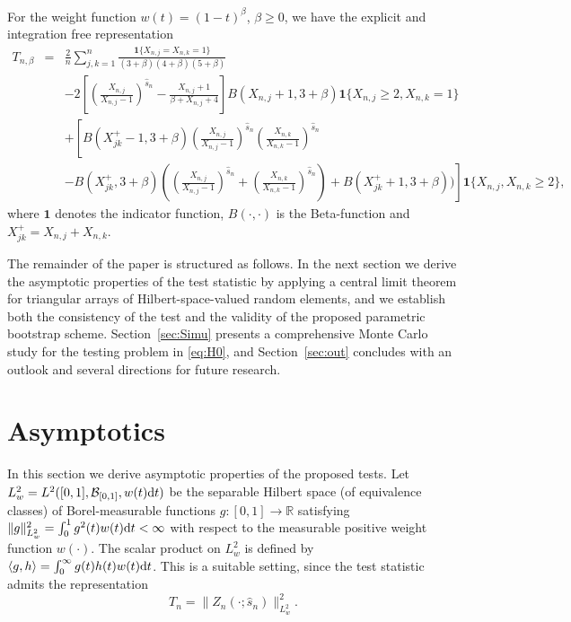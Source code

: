 \documentclass{article}
\theoremstyle{thm}
\theoremstyle{def}
\newcommand{\R}{\mathbb{R}} %
\begin{document}
For  the weight function $w(t)=(1-t)^\beta$, $\beta\ge0$, we have the explicit and integration free representation
\begin{eqnarray*}
T_{n,\beta}&=&\frac2n\sum_{j,k=1}^n\frac{\mathbf{1}\{X_{n,j}=X_{n,k}=1\}}{(3+\beta)(4+\beta)(5+\beta)}\\&&-2\left[\left(\frac{X_{n,j}}{X_{n,j}-1}\right)^{\widehat{s}_n}-\frac{X_{n,j}+1}{\beta+X_{n,j}+4}\right]B(X_{n,j}+1,3+\beta)\mathbf{1}\{X_{n,j}\ge2,X_{n,k}=1\}\\
&&+\left[B(X_{jk}^+-1,3+\beta)\left(\frac{X_{n,j}}{X_{n,j}-1}\right)^{\widehat{s}_n}\left(\frac{X_{n,k}}{X_{n,k}-1}\right)^{\widehat{s}_n}\right.
\\&&\left.-B(X_{jk}^+,3+\beta)\left(\left(\frac{X_{n,j}}{X_{n,j}-1}\right)^{\widehat{s}_n}+\left(\frac{X_{n,k}}{X_{n,k}-1}\right)^{\widehat{s}_n}\right)+B(X_{jk}^++1,3+\beta))\right]\mathbf{1}\{X_{n,j},X_{n,k}\ge2\},
\end{eqnarray*}
where $\mathbf{1}$ denotes the indicator function, $B(\cdot,\cdot)$ is the Beta-function and $X_{jk}^+=X_{n,j}+X_{n,k}$.

The remainder of the paper is structured as follows. In the next section we derive the asymptotic properties of the test statistic by applying a central limit theorem for triangular arrays of Hilbert-space-valued random elements, and we establish both the consistency of the test and the validity of the proposed parametric bootstrap scheme. Section~\ref{sec:Simu} presents a comprehensive Monte Carlo study for the testing problem in \eqref{eq:H0}, and Section~\ref{sec:out} concludes with an outlook and several directions for future research.


\section{Asymptotics}\label{sec:Asy}

In this section we derive asymptotic properties of the proposed tests. Let \(L_{w}^2=L^2([0,1],\mathcal{B}_{[0,1]}, w(t){\rm d}t)\) be the separable Hilbert space (of equivalence classes) of Borel-measurable functions \(g:[0,1] \rightarrow \R\) satisfying $\|g\|_{L^2_w}^2 = \int_{0}^{1}g^2(t)w(t){\rm d}t < \infty$ with respect to the measurable positive weight function $w(\cdot)$. The scalar product on $L_w^2$ is defined by \(\langle g,h\rangle = \int_{0}^{\infty} g(t)h(t)w(t){\rm d}t\). This is a suitable setting, since the test statistic admits the representation
\begin{equation*}
T_n=\|Z_n(\cdot;\widehat{s}_n)\|_{L^2_w}^2.
\end{equation*}
\end{document}
